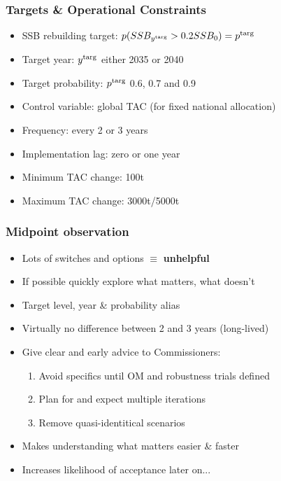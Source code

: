 \documentclass{beamer}
\begin{document}
\begin{frame}
\frametitle{Targets \& Operational Constraints}
\begin{itemize}
    \item SSB rebuilding target: $p(SSB_{y^{\rm targ}}>0.2 SSB_0)=p^{\rm targ}$ 
    \item Target year: $y^{\rm targ}$ either 2035 or 2040
    \item Target probability: $p^{\rm targ}$ 0.6, 0.7 and 0.9
    \item Control variable: global TAC (for fixed national allocation)
    \item Frequency: every 2 or 3 years 
    \item Implementation lag: zero or one year
    \item Minimum TAC change: 100t 
    \item Maximum TAC change: 3000t/5000t
\end{itemize}
\end{frame}
\begin{frame}
\frametitle{Midpoint observation}
\begin{itemize}
    \item Lots of switches and options $\equiv$ \textbf{unhelpful}
    \item If possible quickly explore what matters, what doesn't
    \item Target level, year \& probability alias 
    \item Virtually no difference between 2 and 3 years (long-lived)
    \item Give clear and early advice to Commissioners:
        \begin{enumerate}
            \item Avoid specifics until OM and robustness trials defined
            \item Plan for and expect multiple iterations
            \item Remove quasi-identitical scenarios 
        \end{enumerate}
    \item Makes understanding what matters easier \& faster
    \item Increases likelihood of acceptance later on...
\end{itemize}
\end{frame}
\end{document}
